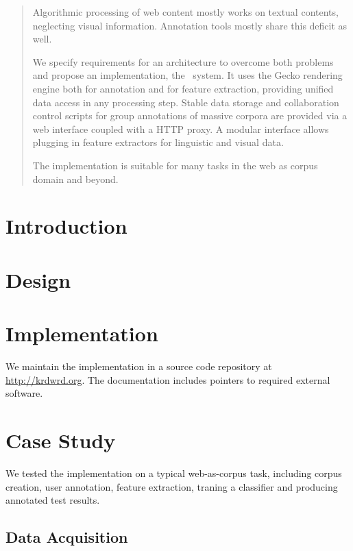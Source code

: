 
\begin{abstract}
Algorithmic processing of web content mostly works on textual contents, neglecting visual information.
Annotation tools mostly share this deficit as well.

We specify requirements for an architecture to overcome both problems and propose an implementation, the \KrdWrd~system.
It uses the Gecko rendering engine both for annotation and for feature extraction, providing unified data access in any processing step.
Stable data storage and collaboration control scripts for group annotations of massive corpora are provided via a web interface coupled with a HTTP proxy.
A modular interface allows plugging in feature extractors for linguistic and visual data.

The implementation is suitable for many tasks in the web as corpus domain and beyond.
\end{abstract}

\section{Introduction}


\section{Design\label{design}}


\section{Implementation\label{impl}}

We maintain the implementation in a source code repository at \url{http://krdwrd.org}.
The documentation includes pointers to required external software.



\section{Case Study\label{casestudy}}

We tested the implementation on a typical web-as-corpus task, including corpus creation, user annotation, feature extraction, traning a classifier and producing annotated test results.

\subsection{Data Acquisition\label{datagather}}

